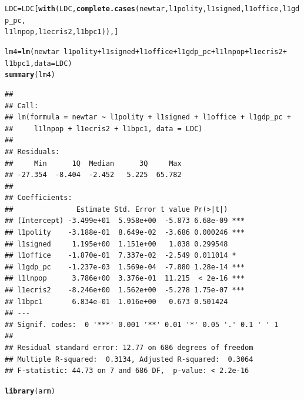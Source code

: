 \documentclass[12pt]{article}\usepackage[]{graphicx}\usepackage[]{color}
\makeatletter
\newcommand{\hlopt}[1]{\textcolor[rgb]{0,0,0}{#1}}%
\newcommand{\hlstd}[1]{\textcolor[rgb]{0.345,0.345,0.345}{#1}}%
\newcommand{\hlkwb}[1]{\textcolor[rgb]{0.69,0.353,0.396}{#1}}%
\newcommand{\hlkwc}[1]{\textcolor[rgb]{0.333,0.667,0.333}{#1}}%
\newcommand{\hlkwd}[1]{\textcolor[rgb]{0.737,0.353,0.396}{\textbf{#1}}}%
\newenvironment{kframe}{%
 \def\at@end@of@kframe{}%
 \ifinner\ifhmode%
  \def\at@end@of@kframe{\end{minipage}}%
  \begin{minipage}{\columnwidth}%
 \fi\fi%
 \def\FrameCommand##1{\hskip\@totalleftmargin \hskip-\fboxsep
 \colorbox{shadecolor}{##1}\hskip-\fboxsep
     \hskip-\linewidth \hskip-\@totalleftmargin \hskip\columnwidth}%
 \MakeFramed {\advance\hsize-\width
   \@totalleftmargin\z@ \linewidth\hsize
   \@setminipage}}%
 {\par\unskip\endMakeFramed%
 \at@end@of@kframe}
\newenvironment{knitrout}{}{} %
\makeatother
\begin{document}
\begin{knitrout}
\color{fgcolor}\begin{kframe}
\begin{alltt}
\hlstd{LDC} \hlkwb{=} \hlstd{LDC[}\hlkwd{with}\hlstd{(LDC,} \hlkwd{complete.cases}\hlstd{(newtar, l1polity, l1signed, l1office, l1gdp_pc,}
    \hlstd{l1lnpop, l1ecris2, l1bpc1)), ]}

\hlstd{lm4} \hlkwb{=} \hlkwd{lm}\hlstd{(newtar} \hlopt{~} \hlstd{l1polity} \hlopt{+} \hlstd{l1signed} \hlopt{+} \hlstd{l1office} \hlopt{+} \hlstd{l1gdp_pc} \hlopt{+} \hlstd{l1lnpop} \hlopt{+} \hlstd{l1ecris2} \hlopt{+}
    \hlstd{l1bpc1,} \hlkwc{data} \hlstd{= LDC)}
\hlkwd{summary}\hlstd{(lm4)}
\end{alltt}
\begin{verbatim}
## 
## Call:
## lm(formula = newtar ~ l1polity + l1signed + l1office + l1gdp_pc + 
##     l1lnpop + l1ecris2 + l1bpc1, data = LDC)
## 
## Residuals:
##     Min      1Q  Median      3Q     Max 
## -27.354  -8.404  -2.452   5.225  65.782 
## 
## Coefficients:
##               Estimate Std. Error t value Pr(>|t|)    
## (Intercept) -3.499e+01  5.958e+00  -5.873 6.68e-09 ***
## l1polity    -3.188e-01  8.649e-02  -3.686 0.000246 ***
## l1signed     1.195e+00  1.151e+00   1.038 0.299548    
## l1office    -1.870e-01  7.337e-02  -2.549 0.011014 *  
## l1gdp_pc    -1.237e-03  1.569e-04  -7.880 1.28e-14 ***
## l1lnpop      3.786e+00  3.376e-01  11.215  < 2e-16 ***
## l1ecris2    -8.246e+00  1.562e+00  -5.278 1.75e-07 ***
## l1bpc1       6.834e-01  1.016e+00   0.673 0.501424    
## ---
## Signif. codes:  0 '***' 0.001 '**' 0.01 '*' 0.05 '.' 0.1 ' ' 1
## 
## Residual standard error: 12.77 on 686 degrees of freedom
## Multiple R-squared:  0.3134,	Adjusted R-squared:  0.3064 
## F-statistic: 44.73 on 7 and 686 DF,  p-value: < 2.2e-16
\end{verbatim}
\begin{alltt}
\hlkwd{library}\hlstd{(arm)}
\end{alltt}



\end{kframe}
\end{knitrout}
\end{document}
